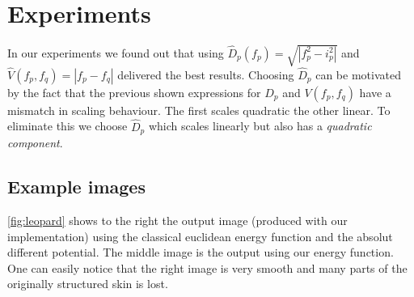 \documentclass[runningheads,a4paper]{llncs}
\begin{document}
\section{Experiments}
    In our experiments we found out that using  $\hat D_p(f_p) = \sqrt{|f_p^2 - i_p^2|}$ and  $\hat V(f_p, f_q) = |f_p-f_q|$ delivered the best results.
    Choosing $\hat D_p$ can be motivated by the fact that the previous shown expressions for $D_p$ and $V(f_p,f_q)$ have a mismatch in scaling behaviour. The first scales quadratic the other linear.
    To eliminate this we choose $\hat D_p$ which scales linearly but also has a \textit{quadratic component}.
   
    \subsection{Example images}
    \autoref{fig:leopard} shows to the right the output image (produced with our \abswap implementation) using the classical euclidean energy function and the absolut different potential. The middle image
    is the output using our energy function. One can easily notice that the right image is very smooth and many parts of the originally structured skin is lost.
\end{document}
